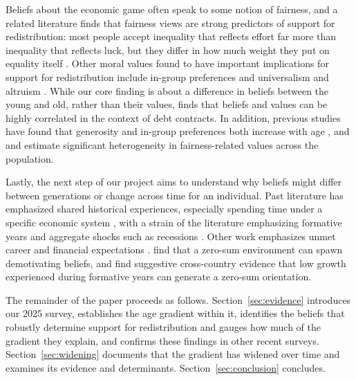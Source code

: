 \documentclass[11pt, headsepline]{article}
\begin{document}
Beliefs about the economic game often speak to some notion of fairness, and a related literature finds that fairness views are strong predictors of support for redistribution: most people accept inequality that reflects effort far more than inequality that reflects luck, but they differ in how much weight they put on equality itself \citep{fong2001social, alesina2005preferences, cappelen2007pluralism, krawczyk2010glimpse, durante2014preferences, almaas2020cutthroat, stantcheva2021understanding, cavaille2023fair, bonnet2025explains, fehr2026social, almaas2026fairness}.
Other moral values found to have important implications for support for redistribution include in-group preferences and universalism \citep{luttmer2001group,enke2020moral,londono2022impact,enke2023moral,alesina2023immigration,fischbacher2023identity} and altruism \citep{fehr2026social}. 
While our core finding is about a difference in beliefs between the young and old, rather than their values, \cite{paine2025attitudes} finds that beliefs and values can be highly correlated in the context of debt contracts. In addition, previous studies have found that generosity and in-group preferences both increase with age \citep{cutler2021older,cappelen2025universalism}, and \cite{cappelen2007pluralism} and \cite{fehr2026social} estimate significant heterogeneity in fairness-related values across the population. 

Lastly, the next step of our project aims to understand why beliefs might differ between generations or change across time for an individual. Past literature has emphasized shared historical experiences, especially spending time under a specific economic system \citep{alesina2007good,landier2008investigating,fuchs2015endogeneity}, with a strain of the literature emphasizing formative years \citep{mannheim1952sociological,krosnick1989aging,malmendier2011depression,roth2018experienced} and aggregate shocks such as recessions \citep{margalit2013explaining, carreri2023economic, giuliano2023recessions, giuliano2024aggregate}. Other work emphasizes unmet career and financial expectations \citep{kurer2022disappointed,cox2024great}. \cite{carvalho2023zero} find that a zero-sum environment can spawn demotivating beliefs, and \cite{chinoy2026zero} find suggestive cross-country evidence that low growth experienced during formative years can generate a zero-sum orientation. 

The remainder of the paper proceeds as follows. Section~\ref{sec:evidence} introduces our 2025 survey, establishes the age gradient within it, identifies the beliefs that robustly determine support for redistribution and gauges how much of the gradient they explain, and confirms these findings in other recent surveys. Section~\ref{sec:widening} documents that the gradient has widened over time and examines its evidence and determinants. Section~\ref{sec:conclusion} concludes.
\end{document}
